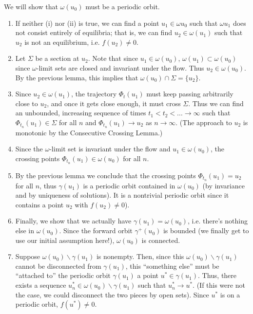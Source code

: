 \documentclass{article}
\begin{document}
We will show that $\omega(u_0)$ must be a periodic orbit.

\begin{enumerate}
\item If neither (i) nor (ii) is true, we can find a point $u_1 \in \omega{u_0}$ such that $\omega{u_1}$ does not consist entirely of equilibria; that is, we can find $u_2 \in \omega(u_1)$ such that $u_2$ is not an equilibrium, i.e. $f(u_2) \neq 0$.

\item Let $\Sigma$ be a section at $u_2$. Note that since $u_1 \in \omega(u_0)$, $\omega(u_1) \subset \omega(u_0)$ since $\omega$-limit sets are closed and invariant under the flow. Thus $u_2 \in \omega(u_0)$. By the previous lemma, this implies that $\omega(u_0) \cap \Sigma = \{ u_2 \}$.

\item Since $u_2 \in \omega(u_1)$, the trajectory $\Phi_t(u_1)$ must keep passing arbitrarily close to $u_2$, and once it gets close enough, it must cross $\Sigma$. Thus we can find an unbounded, increasing sequence of times $t_1 < t_2 < \dots \rightarrow \infty$ such that $\Phi_{t_n}(u_1) \in \Sigma$ for all $n$ and $\Phi_{t_n}(u_1) \rightarrow u_2$ as $n \rightarrow \infty$. (The approach to $u_2$ is monotonic by the Consecutive Crossing Lemma.)

\item Since the $\omega$-limit set is invariant under the flow and $u_1 \in \omega(u_0)$, the crossing points $\Phi_{t_n}(u_1) \in \omega(u_0)$ for all $n$.

\item By the previous lemma we conclude that the crossing points $\Phi_{t_n}(u_1) = u_2$ for all $n$, thus $\gamma(u_1)$ is a periodic orbit contained in $\omega(u_0)$ (by invariance and by uniqueness of solutions). It is a nontrivial periodic orbit since it contains a point $u_2$ with $f(u_2) \neq 0$).

\item Finally, we show that we actually have $\gamma(u_1) = \omega(u_0)$, i.e. there's nothing else in $\omega(u_0)$. Since the forward orbit $\gamma^+(u_0)$ is bounded (we finally get to use our initial assumption here!), $\omega(u_0)$ is connected.

\item Suppose $\omega(u_0) \backslash \gamma(u_1)$ is nonempty. Then, since this $\omega(u_0) \backslash \gamma(u_1)$ cannot be disconnected from $\gamma(u_1)$, this ``something else'' must be ``attached to'' the periodic orbit $\gamma(u_1)$ a point $u^* \in \gamma(u_1)$. Thus, there exists a sequence $u_n^* \in \omega(u_0) \backslash \gamma(u_1)$ such that $u_n^* \rightarrow u^*$. (If this were not the case, we could disconnect the two pieces by open sets). Since $u^*$ is on a periodic orbit, $f(u^*) \neq 0$.\\


\end{enumerate}
\end{document}
